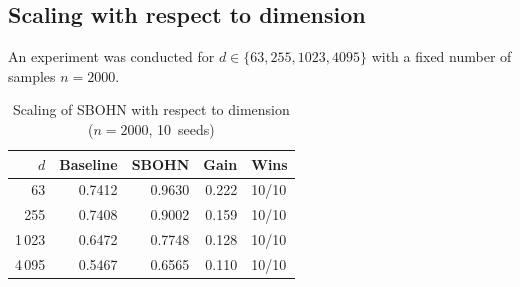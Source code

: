 \subsection{Scaling with respect to dimension}

An experiment was conducted for $d \in \{63, 255, 1023, 4095\}$ with a fixed number of samples $n=2000$.

\begin{table}[H]
\centering
\caption{Scaling of SBOHN with respect to dimension ($n=2000$, 10~seeds)}
\label{tab:scale_d}
\begin{tabular}{rrrrl}
\toprule
$d$ & Baseline & SBOHN & Gain & Wins \\
\midrule
63    & 0.7412 & 0.9630 & 0.222 & 10/10 \\
255   & 0.7408 & 0.9002 & 0.159 & 10/10 \\
1\,023  & 0.6472 & 0.7748 & 0.128 & 10/10 \\
4\,095  & 0.5467 & 0.6565 & 0.110 & 10/10 \\
\bottomrule
\end{tabular}
\end{table}
